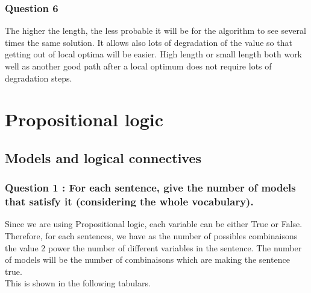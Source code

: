 \documentclass[a4paper,10pt]{article}
\begin{document}
\subsubsection{Question 6}
The higher the length, the less probable it will be for the algorithm to see several times the same solution. It allows also lots of degradation of the value so that getting out of local optima will be easier.
High length or small length both work well as another good path after a local optimum does not require lots of degradation steps.


	
\newpage
	
	
	

\section{Propositional logic}
\subsection{Models and logical connectives}

\subsubsection*{Question 1 : For each sentence, give the number of models that satisfy it (considering the
whole vocabulary).\\}

Since we are using Propositional logic, each variable can be either True or False. Therefore, for each sentences, we have as the number of possibles combinaisons the value 2 power the number of different variables in the sentence. The number of models will be the number of combinaisons which are making the sentence true. \\
This is shown in the following tabulars. \\
\end{document}
